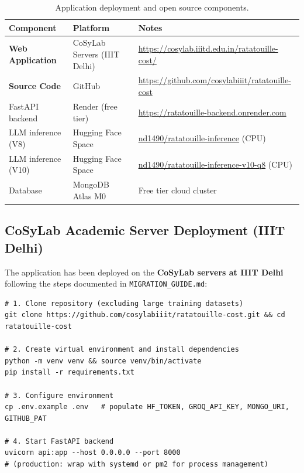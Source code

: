 \documentclass[12pt, a4paper]{article}
\begin{document}
\begin{table}[H]
\centering
\caption{Application deployment and open source components.}
\label{tab:cloud}
\begin{tabularx}{\textwidth}{l l X}
\toprule
\textbf{Component} & \textbf{Platform} & \textbf{Notes} \\
\midrule
\textbf{Web Application} & CoSyLab Servers (IIIT Delhi) & \url{https://cosylab.iiitd.edu.in/ratatouille-cost/} \\
\textbf{Source Code}     & GitHub                       & \url{https://github.com/cosylabiiit/ratatouille-cost} \\
FastAPI backend    & Render (free tier)    & \url{https://ratatouille-backend.onrender.com} \\
LLM inference (V8) & Hugging Face Space    & \url{nd1490/ratatouille-inference} (CPU) \\
LLM inference (V10)& Hugging Face Space    & \url{nd1490/ratatouille-inference-v10-q8} (CPU) \\
Database           & MongoDB Atlas M0      & Free tier cloud cluster \\
\bottomrule
\end{tabularx}
\end{table}

\subsection{CoSyLab Academic Server Deployment (IIIT Delhi)}

The application has been deployed on the \textbf{CoSyLab servers at IIIT Delhi} following the
steps documented in \texttt{MIGRATION\_GUIDE.md}:

\begin{lstlisting}[style=bash, caption={Backend setup on CoSyLab server.}]
# 1. Clone repository (excluding large training datasets)
git clone https://github.com/cosylabiiit/ratatouille-cost.git && cd ratatouille-cost

# 2. Create virtual environment and install dependencies
python -m venv venv && source venv/bin/activate
pip install -r requirements.txt

# 3. Configure environment
cp .env.example .env   # populate HF_TOKEN, GROQ_API_KEY, MONGO_URI, GITHUB_PAT

# 4. Start FastAPI backend
uvicorn api:app --host 0.0.0.0 --port 8000
# (production: wrap with systemd or pm2 for process management)
\end{lstlisting}
\end{document}
